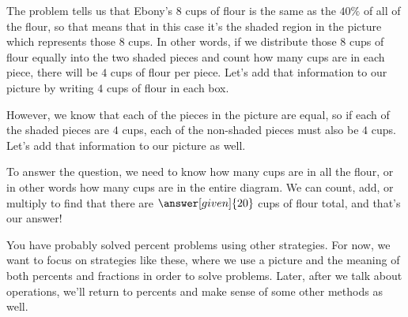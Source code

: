 \documentclass{ximera}
\begin{document}
\begin{question}
\begin{explanation}
The problem tells us that Ebony's $8$ cups of flour is the same as the $40\%$ of all of the flour, so that means that in this case it's the shaded region in the picture which represents those $8$ cups. In other words, if we distribute those $8$ cups of flour equally into the two shaded pieces and count how many cups are in each piece, there will be $4$ cups of flour per piece. Let's add that information to our picture by writing $4$ cups of flour in each box.

\begin{image}
\end{image}

However, we know that each of the pieces in the picture are equal, so if each of the shaded pieces are $4$ cups, each of the non-shaded pieces must also be $4$ cups. Let's add that information to our picture as well. 

\begin{image}
\end{image}
To answer the question, we need to know how many cups are in all the flour, or in other words how many cups are in the entire diagram. We can count, add, or multiply to find that there are $\answer[given]{20}$ cups of flour total, and that's our answer!


\end{explanation}
\end{question}

You have probably solved  percent problems using other strategies. For now, we want to focus on strategies like these, where we use a picture and the meaning of both percents and fractions in order to solve problems. Later, after we talk about operations, we'll return to percents and make sense of some other methods as well.
\end{document}
